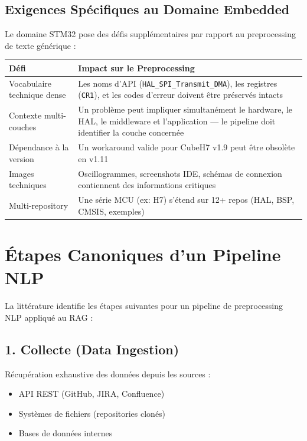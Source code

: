 \documentclass[12pt,a4paper]{report}
\begin{document}
\subsection{Exigences Spécifiques au Domaine Embedded}

Le domaine STM32 pose des défis supplémentaires par rapport au preprocessing de texte générique :

\begin{longtable}{p{4.5cm}p{8.5cm}}
\toprule
\textbf{Défi} & \textbf{Impact sur le Preprocessing} \\
\midrule
Vocabulaire technique dense & Les noms d'API (\texttt{HAL\_SPI\_Transmit\_DMA}), les registres (\texttt{CR1}), et les codes d'erreur doivent être préservés intacts \\
Contexte multi-couches & Un problème peut impliquer simultanément le hardware, le HAL, le middleware et l'application --- le pipeline doit identifier la couche concernée \\
Dépendance à la version & Un workaround valide pour CubeH7 v1.9 peut être obsolète en v1.11 \\
Images techniques & Oscillogrammes, screenshots IDE, schémas de connexion contiennent des informations critiques \\
Multi-repository & Une série MCU (ex: H7) s'étend sur 12+ repos (HAL, BSP, CMSIS, exemples) \\
\bottomrule
\end{longtable}

\section{Étapes Canoniques d'un Pipeline NLP}

La littérature identifie les étapes suivantes pour un pipeline de preprocessing NLP appliqué au RAG \cite{lewis2020rag} :

\subsection{1. Collecte (Data Ingestion)}

Récupération exhaustive des données depuis les sources :
\begin{itemize}
  \item API REST (GitHub, JIRA, Confluence)
  \item Systèmes de fichiers (repositories clonés)
  \item Bases de données internes
\end{itemize}
\end{document}

